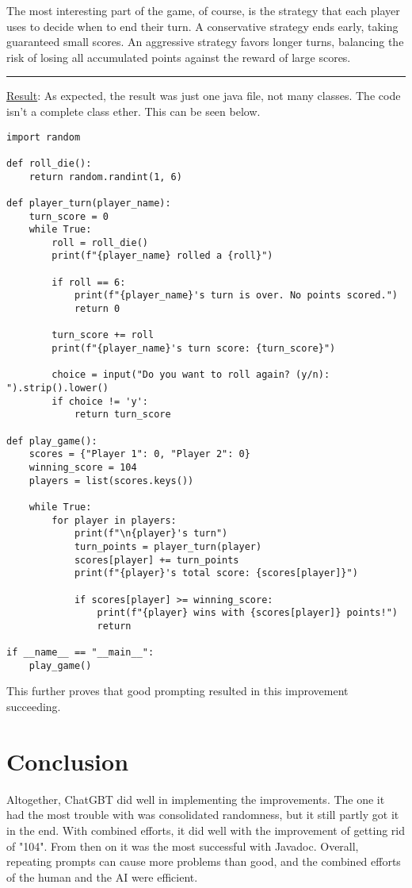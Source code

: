 \documentclass[a4paper,11pt]{article}
\begin{document}
\noindent
The most interesting part of the game, of course, is the strategy that each player uses to decide when to end their turn. A conservative strategy ends early, taking guaranteed small scores. An aggressive strategy favors longer turns, balancing the risk of losing all accumulated points against the reward of large scores.\\
\hrule
\vspace{13pt} %
\noindent
\underline{Result}: 
As expected, the result was just one java file, not many classes. The code isn't a complete class ether. This can be seen below.
\begin{lstlisting}
import random

def roll_die():
    return random.randint(1, 6)

def player_turn(player_name):
    turn_score = 0
    while True:
        roll = roll_die()
        print(f"{player_name} rolled a {roll}")
        
        if roll == 6:
            print(f"{player_name}'s turn is over. No points scored.")
            return 0
        
        turn_score += roll
        print(f"{player_name}'s turn score: {turn_score}")
        
        choice = input("Do you want to roll again? (y/n): ").strip().lower()
        if choice != 'y':
            return turn_score

def play_game():
    scores = {"Player 1": 0, "Player 2": 0}
    winning_score = 104
    players = list(scores.keys())
    
    while True:
        for player in players:
            print(f"\n{player}'s turn")
            turn_points = player_turn(player)
            scores[player] += turn_points
            print(f"{player}'s total score: {scores[player]}")
            
            if scores[player] >= winning_score:
                print(f"{player} wins with {scores[player]} points!")
                return

if __name__ == "__main__":
    play_game()
\end{lstlisting}
This further proves that good prompting resulted in this improvement succeeding. 

\section*{Conclusion}
Altogether, ChatGBT did well in implementing the improvements. The one it had the most trouble with was consolidated randomness, but it still partly got it in the end. With combined efforts, it did well with the improvement of getting rid of "104". From then on it was the most successful with Javadoc. Overall, repeating prompts can cause more problems than good, and the combined efforts of the human and the AI were efficient.  
\end{document}
